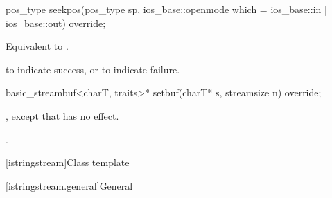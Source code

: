 %
\begin{itemdecl}
pos_type seekpos(pos_type sp,
                 ios_base::openmode which
                   = ios_base::in | ios_base::out) override;
\end{itemdecl}

\begin{itemdescr}
\pnum
\effects
Equivalent to .

\pnum
\returns
{}
to indicate success, or
to indicate failure.
\end{itemdescr}

%
\begin{itemdecl}
basic_streambuf<charT, traits>* setbuf(charT* s, streamsize n) override;
\end{itemdecl}

\begin{itemdescr}
\pnum
\effects
{},
except that
has no effect.

\pnum
\returns
{}.
\end{itemdescr}

[istringstream]{Class template }

[istringstream.general]{General}

